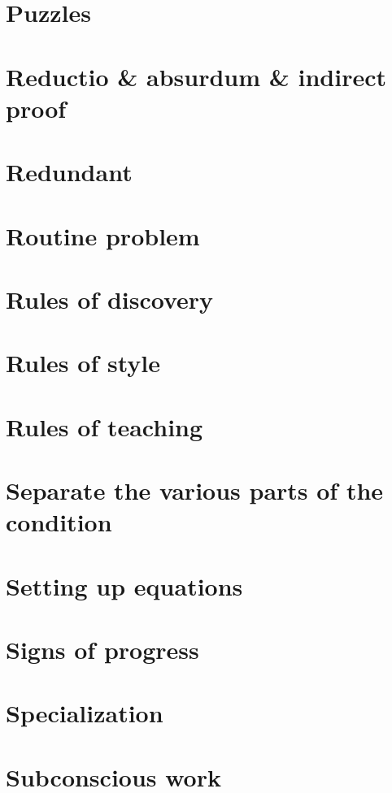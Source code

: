 \documentclass[oneside]{book}
\numberwithin{equation}{section}
\begin{document}
\section*{Puzzles}

\section*{Reductio \& absurdum \& indirect proof}

\section*{Redundant}

\section*{Routine problem}

\section*{Rules of discovery}

\section*{Rules of style}

\section*{Rules of teaching}

\section*{Separate the various parts of the condition}

\section*{Setting up equations}

\section*{Signs of progress}

\section*{Specialization}

\section*{Subconscious work}
\end{document}
